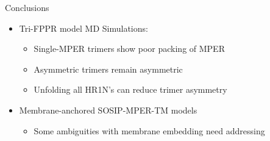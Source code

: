 \begin{frame}[fragile]{Conclusions}
    \begin{itemize}
        \item Tri-FPPR model MD Simulations:
        \begin{itemize}
            \item Single-MPER trimers show poor packing of MPER
            \item Asymmetric trimers remain asymmetric
            \item Unfolding all HR1N's can reduce trimer asymmetry
        \end{itemize}
        \item Membrane-anchored SOSIP-MPER-TM models
        \begin{itemize}
            \item Some ambiguities with membrane embedding need addressing
        \end{itemize}
    \end{itemize}
\end{frame}

